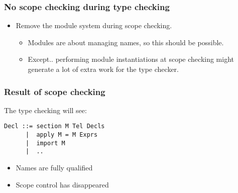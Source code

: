 \documentclass{beamer}
\newenvironment{agda}{
\begin{block}{}\small
}{
\end{block}
}
\begin{document}

\begin{frame}[fragile]
  \frametitle{No scope checking during type checking}

\begin{itemize}
  \item Remove the module system during scope checking.
  \begin{itemize}
    \item Modules are about managing names, so this should be possible.
    \item Except.. performing module instantiations at scope checking might
          generate a lot of extra work for the type checker.
  \end{itemize}
\end{itemize}
\end{frame}


\begin{frame}[fragile]
  \frametitle{Result of scope checking}

The type checking will see:

\begin{agda}
\begin{verbatim}
Decl ::= section M Tel Decls
      |  apply M = M Exprs
      |  import M
      |  ..
\end{verbatim}
\end{agda}

\begin{itemize}
  \item Names are fully qualified
  \item Scope control has disappeared
\end{itemize}

\end{frame}

\end{document}
